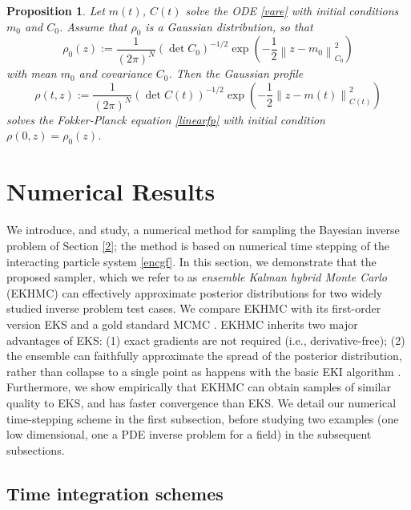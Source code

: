 \documentclass[12pt]{caltech_thesis}
\newtheorem{proposition}[theorem]{Proposition}
\numberwithin{equation}{section}
\begin{document}
\begin{proposition}
\label{prop3}
{Let $m(t)$, $C(t)$ solve the ODE \eqref{vare} with initial conditions $m_0$ and $C_0$.
Assume that $\rho_0$ is a Gaussian distribution, so that
\[\rho_{0}(z):=\frac{1}{(2 \pi)^{N}}\left(\operatorname{det} {C}_{0}\right)^{-1 / 2} \exp \left(-\frac{1}{2}\left\|z-m_{0}\right\|_{{C}_{0}}^{2}\right)\] 
with mean $m_0$ and covariance $C_0$. Then the Gaussian profile \[\rho(t,z):=\frac{1}{(2 \pi)^{N}}\left(\operatorname{det} {C}({t})\right)^{-1 / 2} \exp \left(-\frac{1}{2}\left\|z-m({t})\right\|_{{C}({t})}^{2}\right)\] solves the Fokker-Planck equation \eqref{linearfp} with initial condition $\rho(0,z)=\rho_{0}(z)$.}
\end{proposition}

\vspace{0.1in}

\section{Numerical Results}
\label{4}

{We introduce, and study, a numerical method for sampling the Bayesian inverse problem of Section \ref{2}; the method is based on numerical time  stepping of the interacting particle system \eqref{encgf}.}
{In this section, we demonstrate that the proposed sampler, which we refer to as
\emph{ensemble Kalman hybrid Monte Carlo} (EKHMC) can effectively approximate posterior distributions for two widely studied inverse problem test cases. We compare EKHMC with its first-order version EKS \cite{garbuno2020interacting} and a gold standard MCMC \cite{brooks2011handbook}. EKHMC inherits two major advantages of EKS: (1) exact gradients are not required (i.e., derivative-free); (2) the ensemble can faithfully approximate the spread of the posterior distribution, rather than collapse to a single point as happens with the
basic EKI algorithm \cite{schillings2017analysis}.
Furthermore, we show empirically that EKHMC can obtain samples of  similar quality to EKS, and has faster convergence than EKS. We detail our numerical time-stepping
scheme in the first subsection,
before studying two examples (one low dimensional, one a PDE inverse problem for a field) in
the subsequent subsections.}


\subsection{Time integration schemes}
\end{document}
